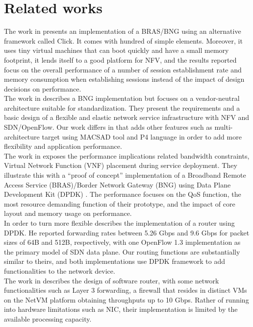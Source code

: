 \chapter{Related works}
\label{cap:cap03}

The work in \cite{Rethinking} presents an implementation of a BRAS/BNG using an alternative framework called Click. It comes with hundred of simple elements. Moreover, it uses tiny virtual machines that can boot quickly and have a small memory footprint,  it lends itself to a good platform for NFV, and the results reported focus on the overall performance of a number of session establishment rate and memory consumption when establishing sessions instead of the impact of design decisions on performance.\\

The work in \cite{Masutani} describes a BNG implementation but focuses on a vendor-neutral architecture suitable for standardization. They present the requirements and a basic design of
a flexible and elastic network service infrastructure with NFV and SDN/OpenFlow. Our work differs in that adds other features such as multi-architecture target using MACSAD tool and P4 language in order to add more flexibility and application performance.\\

The work in \cite{Nemeth} exposes the performance implications related bandwidth constraints, Virtual Network Function (VNF) placement during service deployment.  They illustrate this with a “proof of concept” implementation of a Broadband Remote Access Service (BRAS)/Border Network Gateway (BNG) using Data Plane Development Kit (DPDK) \cite{dpdk}. The performance focuses on the QoS function, the most resource demanding function of their prototype, and the impact of core layout and memory usage on performance.\\


In order to turn more flexible \cite{Pongracz} describes the implementation of a router using DPDK. He reported forwarding rates between 5.26 Gbps and 9.6 Gbps for packet sizes of 64B and 512B, respectively, with one OpenFlow 1.3 implementation as the primary model of SDN data plane. Our routing functions are substantially similar to theirs, and both implementations use DPDK framework to add functionalities to the network device.\\


The work in \cite{Hwang} describes the design of software router, with some network functionalities such as Layer 3 forwarding, a firewall that resides in distinct VMs on the NetVM platform obtaining throughputs up to 10 Gbps. Rather of running into hardware limitations such as NIC, their implementation is limited by the available processing capacity.\\

